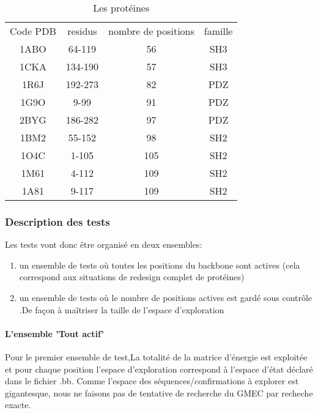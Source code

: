     \begin{table}[!htbp]
      \centering

      \begin{tabular}{cccc}

        \toprule
        Code PDB & residus & nombre de positions & famille\\
        \cmidrule{1-4}
        1ABO & 	64-119	 & 	56	 & SH3 \\
        1CKA & 	134-190	 & 	57	 & SH3 \\
        1R6J & 	192-273	 & 	82	 & PDZ \\
        1G9O & 	9-99	 & 	91	 & PDZ \\
        2BYG & 	186-282	 & 	97	 & PDZ \\
        1BM2 & 	55-152	 & 	98	 & SH2 \\
        1O4C & 	1-105	 & 	105	 & SH2 \\
        1M61 & 	4-112	 & 	109	 & SH2 \\
        1A81 & 	9-117	 & 	109	 & SH2 \\
        \bottomrule

      \end{tabular}      
      \caption{Les protéines}
\label{tab:protéines}      
    \end{table}

\subsubsection{Description des tests}


Les tests vont donc être organisé en deux ensembles:
\begin{enumerate}
\item un ensemble de tests où toutes les positions du backbone sont actives (cela correspond aux situations de redesign complet de protéines) 
\item un ensemble de tests où le nombre de positions actives est gardé sous contrôle .De façon à maîtriser la taille de l'espace d'exploration
\end{enumerate}


\paragraph{L'ensemble 'Tout actif'}

Pour le premier ensemble de test,La totalité de la matrice d'énergie est exploitée et pour chaque position l'espace d'exploration correspond à l'espace d'état déclaré dans le fichier .bb.
Comme l'espace des séquences/confirmations à explorer est gigantesque, nous ne faisons pas de tentative de recherche du GMEC  par recheche exacte. 

